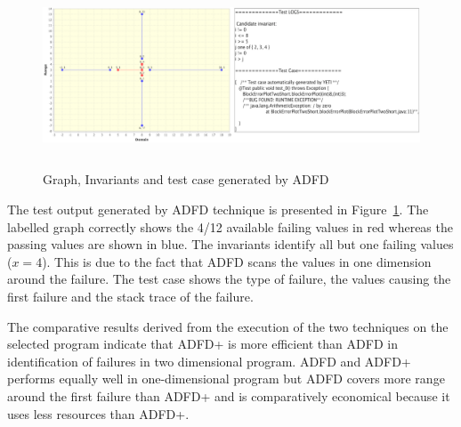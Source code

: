 \documentclass[runningheads,a4paper]{llncs}
\begin{document}
\begin{figure}[H]
\centering
\includegraphics[width= 12.5cm,height=5.5cm]{adfdCombined.png}
\caption{Graph, Invariants and test case generated by ADFD}
\label{fig:ADFD}
\end{figure}

The test output generated by ADFD technique is presented in Figure~\ref{fig:ADFD}. The labelled graph correctly shows the 4/12 available failing values in red whereas the passing values are shown in blue. The invariants identify all but one failing values ($x = 4$). This is due to the fact that ADFD scans the values in one dimension around the failure. The test case shows the type of failure, the values causing the first failure and the stack trace of the failure. 

The comparative results derived from the execution of the two techniques on the selected program indicate that ADFD+ is more efficient than ADFD in identification of failures in two dimensional program. ADFD and ADFD+ performs equally well in one-dimensional program but ADFD covers more range around the first failure than ADFD+ and is comparatively economical because it uses less resources than ADFD+.
\end{document}
